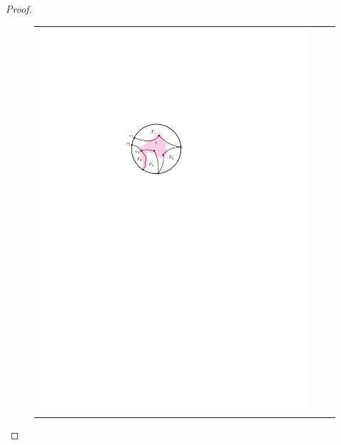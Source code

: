 \documentclass{patmorin}
\theoremstyle{plain}
\theoremstyle{definition}
\begin{document}
\begin{proof}
	\begin{figure}
		\begin{center}
			\begin{tabular}{ccc}
				\includegraphics{figs/zoomba-1} &

\end{tabular}
\end{center}
\end{figure}
\end{proof}
\end{document}

